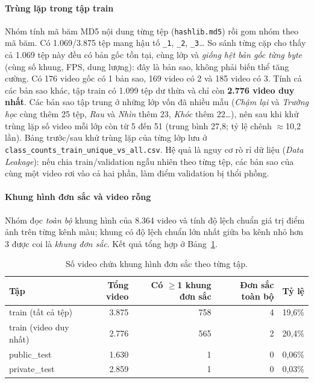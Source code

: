 \paragraph{Trùng lặp trong tập train} Nhóm tính mã băm MD5 nội dung từng tệp (\texttt{hashlib.md5}) rồi gom nhóm theo mã băm. Có 1.069/3.875 tệp mang hậu tố \texttt{\_1}, \texttt{\_2}, \texttt{\_3}\ldots{} So sánh từng cặp cho thấy cả 1.069 tệp này đều có bản gốc tồn tại, cùng lớp và \emph{giống hệt bản gốc từng byte} (cùng số khung, FPS, dung lượng): đây là bản sao, không phải biến thể tăng cường. Có 176 video gốc có 1 bản sao, 169 video có 2 và 185 video có 3. Tính cả các bản sao khác, tập train có 1.099 tệp dư thừa và chỉ còn \textbf{2.776 video duy nhất}. Các bản sao tập trung ở những lớp vốn đã nhiều mẫu (\textit{Chậm lại} và \textit{Trường học} cùng thêm 25 tệp, \textit{Rau} và \textit{Nhìn} thêm 23, \textit{Khóc} thêm 22\ldots), nên sau khi khử trùng lặp số video mỗi lớp còn từ 5 đến 51 (trung bình 27,8; tỷ lệ chênh $\approx$10,2 lần). Bảng trước/sau khử trùng lặp của từng lớp lưu ở \texttt{class\_counts\_train\_unique\_vs\_all.csv}. Hệ quả là nguy cơ rò rỉ dữ liệu (\textit{Data Leakage}): nếu chia train/validation ngẫu nhiên theo từng tệp, các bản sao của cùng một video rơi vào cả hai phần, làm điểm validation bị thổi phồng.

\paragraph{Khung hình đơn sắc và video rỗng} Nhóm đọc \emph{toàn bộ} khung hình của 8.364 video và tính độ lệch chuẩn giá trị điểm ảnh trên từng kênh màu; khung có độ lệch chuẩn lớn nhất giữa ba kênh nhỏ hơn 3 được coi là \emph{khung đơn sắc}. Kết quả tổng hợp ở Bảng~\ref{tab:eda_solid}.

\begin{table}[H]
  \centering
  \caption{Số video chứa khung hình đơn sắc theo từng tập.}
  \label{tab:eda_solid}
  \begin{tabular}{@{}lrrrr@{}}
    \toprule
    \textbf{Tập} & \textbf{Tổng video} & \textbf{Có $\geq$1 khung đơn sắc} & \textbf{Đơn sắc toàn bộ} & \textbf{Tỷ lệ} \\
    \midrule
    train (tất cả tệp)        & 3.875 & 758 & 4 & 19,6\% \\
    train (video duy nhất)    & 2.776 & 565 & 2 & 20,4\% \\
    public\_test              & 1.630 & 1   & 0 & 0,06\% \\
    private\_test             & 2.859 & 1   & 0 & 0,03\% \\
    \bottomrule
  \end{tabular}
\end{table}

